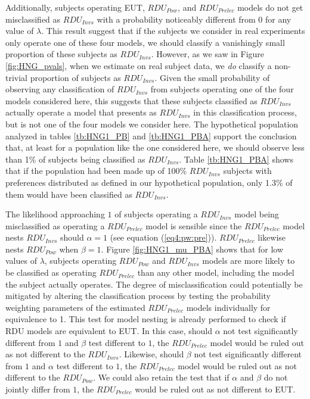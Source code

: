 \documentclass[../main.tex]{subfiles}
\begin{document}
Additionally, subjects operating EUT, $\mathit{RDU_{Pow}}$, and $\mathit{RDU_{Prelec}}$ models do not get misclassified as $\mathit{RDU_{Invs}}$ with a probability noticeably different from 0 for any value of $\lambda$.
This result suggest that if the subjects we consider in real experiments only operate one of these four models, we should classify a vanishingly small proportion of these subjects as $\mathit{RDU_{Invs}}$.
However, as we saw in Figure \ref{fig:HNG_pvals}, when we estimate on real subject data, we \textit{do} classify a non-trivial proportion of subjects as $\mathit{RDU_{Invs}}$.
Given the small probability of observing any classification of $\mathit{RDU_{Invs}}$ from subjects operating one of the four models considered here, this suggests that these subjects classified as $\mathit{RDU_{Invs}}$ actually operate a model that presents as $\mathit{RDU_{Invs}}$ in this classification process, but is not one of the four models we consider here.
The hypothetical population analyzed in tables \ref{tb:HNG1_PB} and \ref{tb:HNG1_PBA} support the conclusion that, at least for a population like the one considered here, we should observe less than 1\% of subjects being classified as $\mathit{RDU_{Invs}}$.
Table \ref{tb:HNG1_PBA} shows that if the population had been made up of 100\% $\mathit{RDU_{Invs}}$ subjects with preferences distributed as defined in our hypothetical population, only 1.3\% of them would have been classified as $\mathit{RDU_{Invs}}$.

The likelihood approaching $1$ of subjects operating a $\mathit{RDU_{Invs}}$ model being misclassified as operating a $\mathit{RDU_{Prelec}}$ model is sensible since the $\mathit{RDU_{Prelec}}$ model nests $\mathit{RDU_{Invs}}$ should $\alpha = 1$ (see equation (\ref{eq4:pw:pre})).
$\mathit{RDU_{Prelec}}$ likewise nests $\mathit{RDU_{Pow}}$ when $\beta = 1$.
Figure \ref{fig:HNG1_mu_PBA} shows that for low values of $\lambda$, subjects operating $\mathit{RDU_{Pow}}$ and $\mathit{RDU_{Invs}}$ models are more likely to be classified as operating $\mathit{RDU_{Prelec}}$ than any other model, including the model the subject actually operates.
The degree of misclassification could potentially be mitigated by altering the classification process by testing the probability weighting parameters of the estimated $\mathit{RDU_{Prelec}}$ models individually for equivalence to 1.
This test for model nesting is already performed to check if RDU models are equivalent to EUT.
In this case, should $\alpha$ not test significantly different from $1$ and $\beta$ test different to $1$, the $\mathit{RDU_{Prelec}}$ model would be ruled out as not different to the $\mathit{RDU_{Invs}}$.
Likewise, should $\beta$ not test significantly different from $1$ and $\alpha$ test different to $1$, the $\mathit{RDU_{Prelec}}$ model would be ruled out as not different to the $\mathit{RDU_{Pow}}$.
We could also retain the test that if $\alpha$ and $\beta$ do not jointly differ from $1$, the $\mathit{RDU_{Prelec}}$ would be ruled out as not different to EUT.
\end{document}
